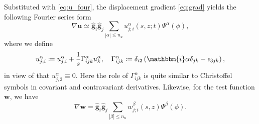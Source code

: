 \documentclass[extra]{gji}
\begin{document}
Substituted with \eqref{eq:u_four}, the displacement gradient 
\eqref{eq:grad} yields the following Fourier series form
\begin{equation}
  \nabla\mathbf{u}\simeq\hat{\mathbf{g}}_{i}\hat{\mathbf{g}}_{j}
  \sum_{|\alpha|\le n_u}u_{j;i}^\alpha\left(s,z;t\right) \Psi^\alpha\left(\phi\right),
  \label{eq:grad_u}
\end{equation}
where we define 
\begin{equation}
  u_{j;i}^\alpha \coloneqq u_{j,i}^\alpha+
  \frac{1}{s}\Gamma_{ijk}^\alpha u_k^\alpha,\quad 
  \Gamma_{ijk}^\alpha \coloneqq  
  \delta_{i2}\left(\mathbbm{i}\alpha\delta_{jk}-\epsilon_{3jk}\right),
  \label{eq:gamma}
\end{equation}
in view of that $u_{j,2}^\alpha \equiv 0$.
Here the role of $\Gamma_{ijk}^{\alpha}$ is quite similar to Christoffel
symbols in covariant and contravariant derivatives. 
Likewise, for the test function $\mathbf{w}$, we have
\begin{equation}
  \nabla\mathbf{w}=\hat{\mathbf{g}}_{i}\hat{\mathbf{g}}_{j}
  \sum_{|\beta|\le n_u}w_{j;i}^\beta\left(s,z\right) \Psi^\beta\left(\phi\right).
  \label{eq:grad_w}
\end{equation}
\end{document}
